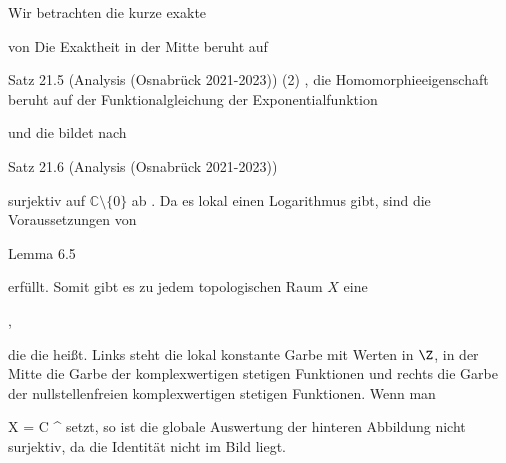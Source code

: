 {





Wir betrachten die kurze exakte  {}

 {  }

von
Die Exaktheit in der Mitte beruht auf

Satz 21.5 (Analysis (Osnabrück 2021-2023))  (2)
,
die Homomorphieeigenschaft beruht auf
der
Funktionalgleichung der Exponentialfunktion

und die
bildet nach

Satz 21.6 (Analysis (Osnabrück 2021-2023))

surjektiv auf ${\mathbb C} \setminus \{0\}$ ab
 {} {.}
Da es lokal einen Logarithmus gibt, sind die Voraussetzungen von

Lemma 6.5

erfüllt. Somit gibt es zu jedem topologischen Raum $X$ eine

 { , }

die die
 {} {}
 {} heißt. Links steht die lokal konstante Garbe mit Werten in $\Z$, in der Mitte die Garbe der komplexwertigen stetigen Funktionen und rechts die Garbe der nullstellenfreien komplexwertigen stetigen Funktionen. Wenn man

\mavergleichskette
{\vergleichskette
{X
}
{ = }{ {\mathbb C} ^{\times}
}
{  }{
}
{    }{
}
{   }{
}
}
{}{}{}
setzt, so ist die globale Auswertung der hinteren Abbildung nicht surjektiv, da die Identität nicht im Bild liegt.





}





